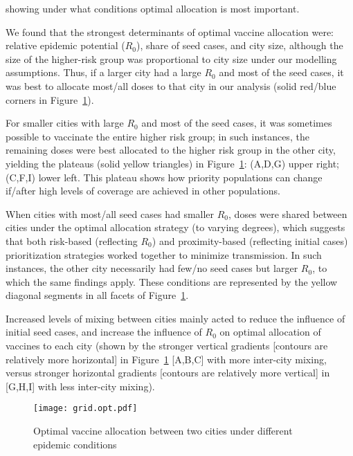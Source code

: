 showing under what conditions optimal allocation is most important.
\par
We found that the strongest determinants of optimal vaccine allocation were:
relative epidemic potential ($R_0$), share of seed cases, and city size,
although the size of the higher-risk group was proportional to
city size under our modelling assumptions.
Thus, if a larger city had a large $R_0$ and most of the seed cases,
it was best to allocate most/all doses to that city in our analysis
(solid red/blue corners in Figure~\ref{fig:grid.opt}).
\par
For smaller cities with large $R_0$ and most of the seed cases,
it was sometimes possible to vaccinate the entire higher risk group;
in such instances, the remaining doses were best allocated to
the higher risk group in the other city,
yielding the plateaus (solid yellow triangles) in Figure~\ref{fig:grid.opt}:
(A,D,G) upper right; (C,F,I) lower left.
This plateau shows how priority populations can change
if/after high levels of coverage are achieved in other populations.
\par
When cities with most/all seed cases had smaller $R_0$,
doses were shared between cities under the optimal allocation strategy (to varying degrees),
which suggests that both risk-based (reflecting $R_0$) and
proximity-based (reflecting initial cases) prioritization strategies
worked together to minimize transmission.
In such instances, the other city necessarily had few/no seed cases but larger $R_0$,
to which the same findings apply.
These conditions are represented by the yellow diagonal segments
in all facets of Figure~\ref{fig:grid.opt}.
\par
Increased levels of mixing between cities
mainly acted to reduce the influence of initial seed cases,
and increase the influence of $R_0$
on optimal allocation of vaccines to each city (shown by the
stronger vertical gradients [contours are relatively more horizontal]
in Figure~\ref{fig:grid.opt} [A,B,C] with more inter-city mixing, versus
stronger horizontal gradients [contours are relatively more vertical]
in [G,H,I] with less inter-city mixing).
\begin{figure}
  \texttt{[image: grid.opt.pdf]}
  \caption{Optimal \MPXV vaccine allocation between two cities
    under different epidemic conditions}
  \label{fig:grid.opt}
  \floatfoot
  \gridfoot
\end{figure}
